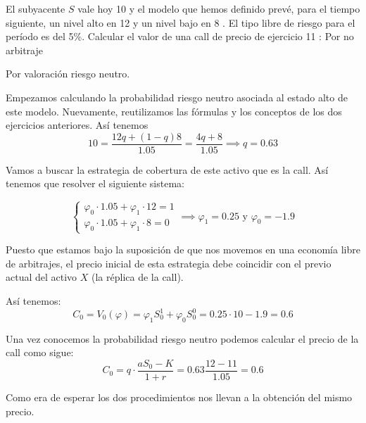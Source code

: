 \begin{problem}[3]
El subyacente $S$ vale hoy 10 \texteuro y el modelo que hemos definido prevé, para el tiempo siguiente, un nivel alto en 12 \texteuro y un nivel bajo en 8 \texteuro. El tipo libre de riesgo para el período es del 5\%. Calcular el valor de una call de precio de ejercicio 11 \texteuro:
\ppart Por no arbitraje

\ppart Por valoración riesgo neutro.
\solution

Empezamos calculando la probabilidad riesgo neutro asociada al estado alto de este modelo. Nuevamente, reutilizamos las fórmulas y los conceptos de los dos ejercicios anteriores. Así tenemos
\[10 = \frac{12q + (1-q)8}{1.05} = \frac{4q+8}{1.05} \implies q=0.63\]

\spart

Vamos a buscar la estrategia de cobertura de este activo que es la call. Así tenemos que resolver el siguiente sistema:

\[\left\{ \begin{array}{l}
\varphi_0 \cdot 1.05 + \varphi_1\cdot 12 = 1 \\
\varphi_0 \cdot 1.05 + \varphi_1\cdot 8 = 0
\end{array}\right. \implies \varphi_1 = 0.25 \text{ y } \varphi_0 = -1.9\]

Puesto que estamos bajo la suposición de que nos movemos en una economía libre de arbitrajes, el precio inicial de esta estrategia debe coincidir con el previo actual del activo $X$ (la réplica de la call).

Así tenemos:
\[C_0 = V_0(\varphi) = \varphi_1 S_0^1 + \varphi_0S_0^0 = 0.25 \cdot 10 - 1.9 = 0.6\]
\spart

Una vez conocemos la probabilidad riesgo neutro podemos calcular el precio de la call como sigue:
\[C_0 = q\cdot \frac{aS_0 - K}{1+r} = 0.63 \frac{12-11}{1.05} = 0.6\]

Como era de esperar los dos procedimientos nos llevan a la obtención del mismo precio.
\end{problem}

